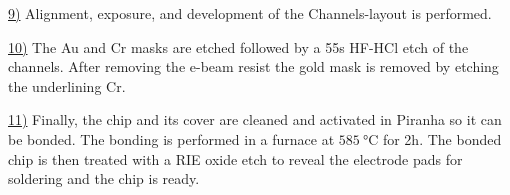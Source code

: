 \documentclass[final]{jyflluk}
\begin{document}
\noindent
\hyperref[fig:process9]{9)} Alignment, exposure, and development of the Channels-layout is performed. 
\vaali

\noindent
\hyperref[fig:process10]{10)} The Au and Cr masks are etched followed by a 55s HF-HCl etch of the channels. After removing the e-beam resist the gold mask is removed by etching the underlining Cr. 
\vaali

\renewcommand{\thesubfigure}{\arabic{subfigure}}


\noindent
\hyperref[fig:process11]{11)} Finally, the chip and its cover are cleaned and activated in Piranha so it can be bonded. The bonding is performed in a furnace at $\SI{585}{\celsius}$ for 2h. The bonded chip is then treated with a RIE oxide etch to reveal the electrode pads for soldering and the chip is ready.
\end{document}
